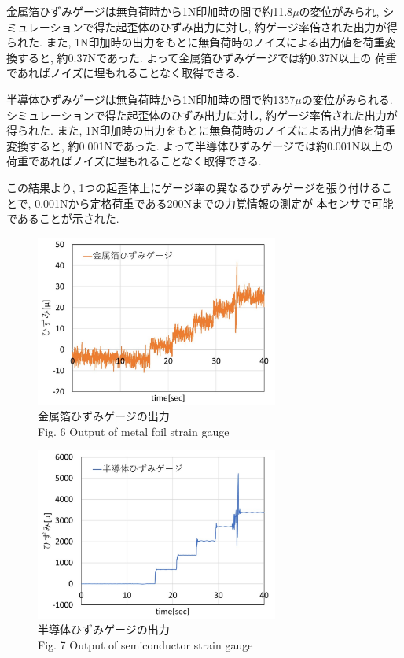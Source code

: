 金属箔ひずみゲージは無負荷時から1N印加時の間で約11.8$\mu$の変位がみられ,  
シミュレーションで得た起歪体のひずみ出力に対し, 約ゲージ率倍された出力が得られた.
また, 1N印加時の出力をもとに無負荷時のノイズによる出力値を荷重変換すると, 
約0.37Nであった. よって金属箔ひずみゲージでは約0.37N以上の
荷重であればノイズに埋もれることなく取得できる.

半導体ひずみゲージは無負荷時から1N印加時の間で約1357$\mu$の変位がみられる. 
シミュレーションで得た起歪体のひずみ出力に対し, 約ゲージ率倍された出力が得られた.
また, 1N印加時の出力をもとに無負荷時のノイズによる出力値を荷重変換すると, 
約0.001Nであった. よって半導体ひずみゲージでは約0.001N以上の
荷重であればノイズに埋もれることなく取得できる.

この結果より, 1つの起歪体上にゲージ率の異なるひずみゲージを張り付けることで, 
0.001Nから定格荷重である200Nまでの力覚情報の測定が
本センサで可能であることが示された. 

\begin{figure}[h]
  \begin{center}
    \includegraphics[width=8.0cm]{pic/kinkekka.jpg}
    \caption{金属箔ひずみゲージの出力\\Fig. 6 Output of metal foil strain gauge}\label{fig:kinkeka}
  \end{center}
\end{figure}

\begin{figure}[h]
  \begin{center}
    \includegraphics[width=8.0cm]{pic/hankekka.jpg}
    \caption{半導体ひずみゲージの出力\\Fig. 7 Output of semiconductor strain gauge}\label{fig:hankekka}
  \end{center}
\end{figure}